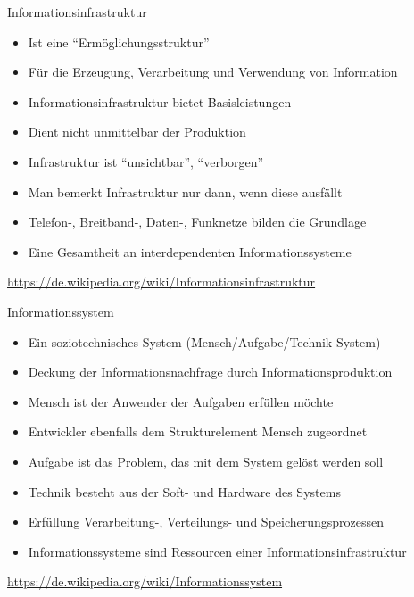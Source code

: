 \documentclass{beamer}
\begin{document}
\begin{frame}{Informationsinfrastruktur}
	
	\begin{itemize}
		\item Ist eine ``Ermöglichungsstruktur''
		\item Für die Erzeugung, Verarbeitung und Verwendung von Information
		\item Informationsinfrastruktur bietet Basisleistungen
		\item Dient nicht unmittelbar der Produktion
		\item Infrastruktur ist ``unsichtbar'', ``verborgen''
		\item Man bemerkt Infrastruktur nur dann, wenn diese ausfällt
		\item Telefon-, Breitband-, Daten-, Funknetze bilden die Grundlage
		\item Eine Gesamtheit an interdependenten Informationssysteme
	\end{itemize}
	
	\begin{flushright}
		\scriptsize\url{https://de.wikipedia.org/wiki/Informationsinfrastruktur}
	\end{flushright}
	
\end{frame}


\begin{frame}{Informationssystem}
	
	\begin{itemize}
		\item Ein soziotechnisches System (Mensch/Aufgabe/Technik-System)
		\item Deckung der Informationsnachfrage durch Informationsproduktion
		\item Mensch ist der Anwender der Aufgaben erfüllen möchte
		\item Entwickler ebenfalls dem Strukturelement Mensch zugeordnet
		\item Aufgabe ist das Problem, das mit dem System gelöst werden soll
		\item Technik besteht aus der Soft- und Hardware des Systems
		\item Erfüllung Verarbeitung-, Verteilungs- und Speicherungsprozessen
		\item Informationssysteme sind Ressourcen einer Informationsinfrastruktur
	\end{itemize}
	
	\begin{flushright}
		\scriptsize\url{https://de.wikipedia.org/wiki/Informationssystem}
	\end{flushright}
	
\end{frame}
\end{document}
